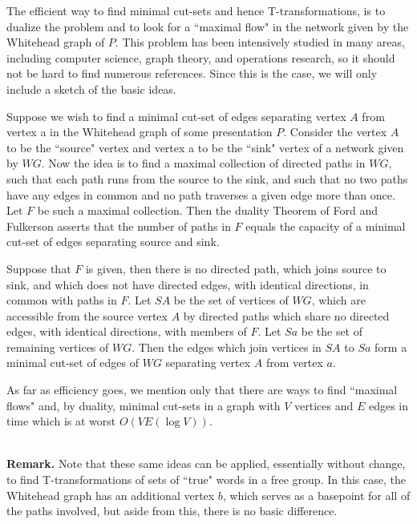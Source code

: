\documentclass[12pt]{amsart}
\newcommand{\remark}{\ \\ \noindent \textbf{Remark.} }
\begin{document}
                The efficient way to find minimal cut-sets and hence T-transformations, is to
        dualize the problem and to look for a  ``maximal flow" in the network given by the
        Whitehead graph of $P$. This problem has been intensively studied in many areas,
        including computer science, graph theory, and operations research, so it should not
        be hard to find numerous references. Since this is the case, we will only include a
        sketch of the basic ideas.
                
                Suppose we wish to find a minimal cut-set of edges separating vertex $A$ from vertex
        a in the Whitehead graph of some presentation $P$. Consider the vertex $A$ to be the
         ``source" vertex and vertex a to be the  ``sink" vertex of a network given by $WG$. Now the
        idea is to find a maximal collection of directed paths in $WG$, such that each path runs
        from the source to the sink, and such that no two paths have any edges in common and no
        path traverses a given edge more than once. Let $F$ be such a maximal collection. Then the
        duality Theorem of Ford and Fulkerson asserts that the number of paths in $F$ equals the
        capacity of a minimal cut-set of edges separating source and sink.
          
        Suppose that $F$ is given, then there is no directed path, which joins source to sink,
        and which does not have directed edges, with identical directions, in common with paths
        in $F$. Let $SA$ be the set of vertices of $WG$, which are accessible from the source vertex $A$
        by directed paths which share no directed edges, with identical directions, with members
        of $F$. Let $Sa$ be the set of remaining vertices of $WG$. Then the edges which join vertices
        in $SA$ to $Sa$ form a minimal cut-set of edges of $WG$ separating vertex $A$ from vertex $a$.

                As far as efficiency goes, we mention only that there are ways to find  ``maximal flows"
        and, by duality, minimal cut-sets in a graph with $V$ vertices and $E$ edges in time which is
        at worst $O(VE(\log V))$.
        
\remark Note that these same ideas can be applied, essentially without change, to find
        T\hyp transformations of sets of  ``true" words in a free group. In this case, the Whitehead
        graph has an additional vertex $b$, which serves as a basepoint for all of the paths
        involved, but aside from this, there is no basic difference.
        
\end{document}
